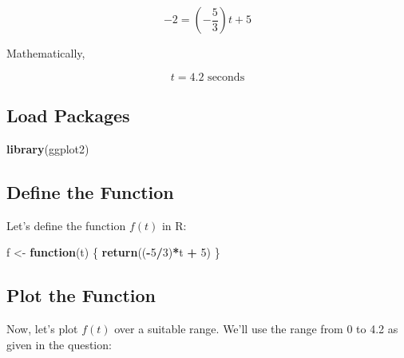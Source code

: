 \documentclass[
]{article}
\newenvironment{Shaded}{\begin{snugshade}}{\end{snugshade}}
\newcommand{\ControlFlowTok}[1]{\textcolor[rgb]{0.13,0.29,0.53}{\textbf{#1}}}
\newcommand{\DecValTok}[1]{\textcolor[rgb]{0.00,0.00,0.81}{#1}}
\newcommand{\FunctionTok}[1]{\textcolor[rgb]{0.13,0.29,0.53}{\textbf{#1}}}
\newcommand{\NormalTok}[1]{#1}
\newcommand{\OtherTok}[1]{\textcolor[rgb]{0.56,0.35,0.01}{#1}}
\newcommand{\SpecialCharTok}[1]{\textcolor[rgb]{0.81,0.36,0.00}{\textbf{#1}}}
\begin{document}
\[-2 =(-\frac{5}{3})t + 5\]

Mathematically,

\[t = 4.2 \text{ seconds}\]

\hypertarget{load-packages}{%
\subsection{Load Packages}\label{load-packages}}

\begin{Shaded}
\begin{Highlighting}[]
\FunctionTok{library}\NormalTok{(ggplot2)}
\end{Highlighting}
\end{Shaded}

\hypertarget{define-the-function}{%
\subsection{Define the Function}\label{define-the-function}}

Let's define the function \(f(t)\) in R:

\begin{Shaded}
\begin{Highlighting}[]
\NormalTok{f }\OtherTok{\textless{}{-}} \ControlFlowTok{function}\NormalTok{(t) \{}
  \FunctionTok{return}\NormalTok{((}\SpecialCharTok{{-}}\DecValTok{5}\SpecialCharTok{/}\DecValTok{3}\NormalTok{)}\SpecialCharTok{*}\NormalTok{t }\SpecialCharTok{+} \DecValTok{5}\NormalTok{)}
\NormalTok{\}}
\end{Highlighting}
\end{Shaded}

\hypertarget{plot-the-function}{%
\subsection{Plot the Function}\label{plot-the-function}}

Now, let's plot \(f(t)\) over a suitable range. We'll use the range from
0 to 4.2 as given in the question:
\end{document}
